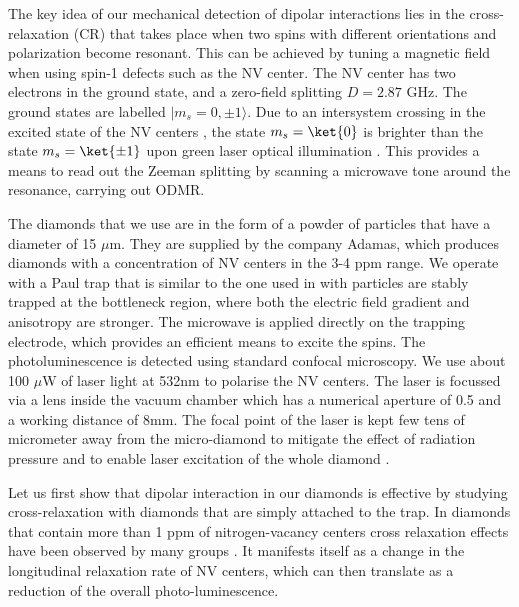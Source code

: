 \documentclass[preprintnumbers,amsmath,amssymb,superscriptaddress,twocolumn,showpacs]{revtex4-1}
\begin{document}
The key idea of our mechanical detection of dipolar interactions lies in the cross-relaxation (CR) that takes place when two spins with different orientations and polarization become resonant. This can be achieved by tuning a magnetic field when using spin-1 defects such as the NV center.
The NV center has two electrons in the ground state, and a zero-field splitting $D=2.87$ GHz.
The ground states are labelled $| m_s={0}, {\pm 1}\rangle$.
Due to an intersystem crossing in the excited state of the NV centers \cite{Doherty}, the state $m_s=\ket{0}$ is brighter than the state $m_s=\ket{\pm 1}$ upon green laser optical illumination \cite{Hopper}. This provides a means to read out the Zeeman splitting by scanning a microwave tone around the resonance, carrying out ODMR.

The diamonds that we use are in the form of a powder of particles that have a diameter of 15 $\mu$m. They are supplied by the company Adamas, which produces diamonds with a concentration of NV centers in the 3-4 ppm range. 
We operate with a Paul trap that is similar to the one used in \cite{delordPRL} with particles are stably trapped at the bottleneck region, where both the electric field gradient and anisotropy are stronger.
The microwave is applied directly on the trapping electrode, which provides an efficient means to excite the spins.
The photoluminescence is detected using standard confocal microscopy. We use about 100 $\mu$W of laser light at 532nm to polarise the NV centers. The laser is focussed via a lens inside the vacuum chamber which has a numerical aperture of 0.5 and a working distance of 8mm. The focal point of the laser is kept few tens of micrometer away from the micro-diamond to mitigate the effect of radiation pressure and to enable laser excitation of the whole diamond \cite{delordPRL,delord2016}. 

Let us first show that dipolar interaction in our diamonds is effective by studying cross-relaxation with diamonds that are simply attached to the trap.
In diamonds that contain more than 1 ppm of nitrogen-vacancy centers cross relaxation effects have been observed by many groups \cite{van_oort_cross-relaxation_1989, armstrong_nvnv_2010, jarmola_longitudinal_2015, akhmedzhanov_microwave-free_2017, akhmedzhanov_magnetometry_2019, holliday_optical_1989, mrozek_longitudinal_2015, jarmola_temperature-_2012, choi_depolarization_2017}.
It manifests itself as a change in the longitudinal relaxation rate of NV centers, which can then translate as a reduction of the overall photo-luminescence. 
\end{document}

